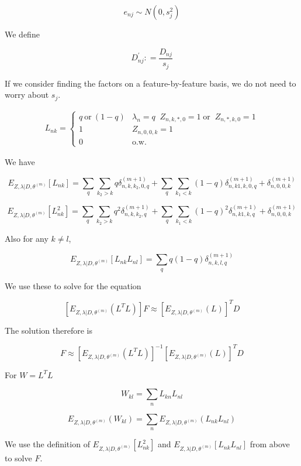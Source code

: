 \documentclass[12pt]{article}
\begin{document}
$$ e_{nj} \sim N(0, s^2_{j}) $$

We define 

$$ D^{'}_{nj} : = \frac{D_{nj}}{s_{j}} $$

If we consider finding the factors on a feature-by-feature basis, we do not need to worry about $s_j$.

\begin{align*}
L_{nk} =
\begin{cases}
    q~\text{or}~(1-q) & \lambda_{n}=q  \; \; Z_{n,k,*, 0}=1 \; \text{or} \;\; Z_{n, *, k, 0} = 1 \\
    1 & Z_{n,0,0,k}=1 \\
    0 & \text{o.w.}
\end{cases}
\end{align*}

We have 

$$ E_{ Z, \lambda | D, \theta^{(m)}} \left [ L_{nk} \right ] = \sum_{q}  \sum_{k_2 > k} q \delta^{(m+1)}_{n, k, k_2, 0, q}  + \sum_{q}  \sum_{k_1 < k} (1-q) \delta^{(m+1)}_{n, k1, k, 0, q} +  \delta^{(m+1)}_{n, 0, 0, k} $$

$$ E_{ Z, \lambda | D, \theta^{(m)}} \left [ L^2_{nk} \right ] = \sum_{q}  \sum_{k_2 > k} q^2 \delta^{(m+1)}_{n,k,k_2, q}  + \sum_{q}  \sum_{k_1 < k} (1-q)^2 \delta^{(m+1)}_{n,k1,k,q} +  \delta^{(m+1)}_{n, 0, 0, k} $$

Also for any $k \neq l$,

$$ E_{ Z, \lambda | D, \theta^{(m)}} \left [ L_{nk}L_{nl} \right ] =
\sum_{q} q(1-q) \delta^{(m+1)}_{n,k,l,q} $$

We use these to solve for the equation

$$ \left [ E_{ Z, \lambda | D, \theta^{(m)}} \left( L^{T}L \right ) \right ] F \approx \left [ E_{ Z, \lambda | D, \theta^{(m)}} (L) \right] ^{T} D $$

The solution therefore is 

$$ F \approx \left [ E_{ Z, \lambda | D, \theta^{(m)}} \left( L^{T}L \right ) \right]^{-1} \left [ E_{ Z, \lambda | D, \theta^{(m)}} (L) \right]^{T} D $$

For $W = L^{T}L$

$$ W_{kl} = \sum_{n} L_{kn}L_{nl} $$

$$ E_{ Z, \lambda | D, \theta^{(m)}} \left ( W_{kl} \right ) = \sum_{n}  E_{ Z, \lambda | D, \theta^{(m)}} \left ( L_{nk}L_{nl} \right) $$

We use the definition of $E_{ Z, \lambda | D, \theta^{(m)}} \left [ L^2_{nk} \right ]$ 
and $E_{ Z, \lambda | D, \theta^{(m)}} \left [ L_{nk}L_{nl} \right ]$ 
from above to solve $F$. 
\end{document}
